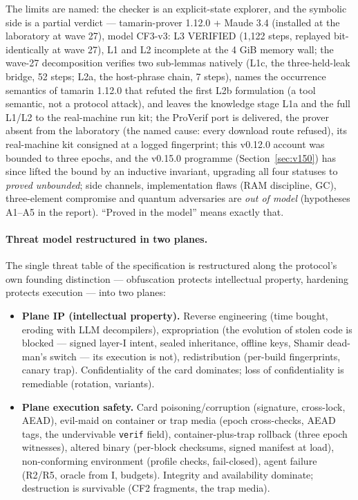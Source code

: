 \documentclass[10pt,a4paper]{article}
\newcommand{\code}[1]{\texttt{\small #1}}
\begin{document}
The limits are named: the checker is an explicit-state explorer, and the symbolic
side is a partial verdict --- tamarin-prover 1.12.0 + Maude 3.4 (installed at the
laboratory at wave 27), model CF3-v3: L3 VERIFIED (1,122 steps, replayed
bit-identically at wave 27), L1 and L2 incomplete at the 4 GiB memory wall; the
wave-27 decomposition verifies two sub-lemmas natively (L1c, the three-held-leak
bridge, 52 steps; L2a, the host-phrase chain, 7 steps), names the occurrence
semantics of tamarin 1.12.0 that refuted the first L2b formulation (a tool
semantic, not a protocol attack), and leaves the knowledge stage L1a and the
full L1/L2 to the real-machine run kit; the ProVerif port is delivered, the
prover absent from the laboratory (the named cause: every download route
refused), its real-machine kit consigned at a logged fingerprint; this v0.12.0 account was bounded to three epochs, and
the v0.15.0 programme (Section~\ref{sec:v150}) has since lifted the
bound by an inductive invariant, upgrading all four statuses to
\emph{proved unbounded}; side channels, implementation flaws (RAM
discipline, GC),
three-element compromise and quantum adversaries are \emph{out of
model} (hypotheses A1--A5 in the report). ``Proved in the model'' means
exactly that.

\paragraph{Threat model restructured in two planes.} The single threat
table of the specification is restructured along the protocol's own
founding distinction --- obfuscation protects intellectual property,
hardening protects execution --- into two planes:

\begin{itemize}
\item \textbf{Plane IP (intellectual property).} Reverse engineering
(time bought, eroding with LLM decompilers), expropriation (the
evolution of stolen code is blocked --- signed layer-I intent, sealed
inheritance, offline keys, Shamir dead-man's switch --- its execution
is not), redistribution (per-build fingerprints, canary trap).
Confidentiality of the card dominates; loss of confidentiality is
remediable (rotation, variants).
\item \textbf{Plane execution safety.} Card poisoning/corruption
(signature, cross-lock, AEAD), evil-maid on container or trap media
(epoch cross-checks, AEAD tags, the undervivable \code{verif} field),
container-plus-trap rollback (three epoch witnesses), altered binary
(per-block checksums, signed manifest at load), non-conforming
environment (profile checks, fail-closed), agent failure (R2/R5,
oracle from I, budgets). Integrity and availability dominate;
destruction is survivable (CF2 fragments, the trap media).
\end{itemize}
\end{document}
